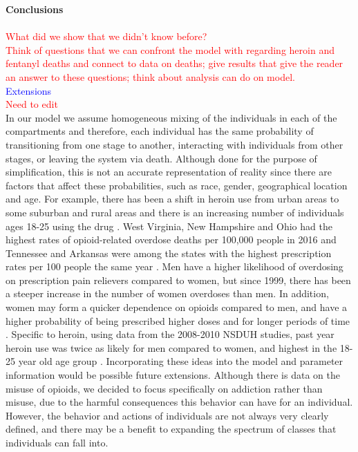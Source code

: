 \documentclass[12pt]{article}
\begin{document}
 
\textbf{Conclusions} \\ \\
 \textcolor{red}{What did we show that we didn't know before?} \\
 \textcolor{red}{Think of questions that we can confront the model with regarding heroin and fentanyl deaths and connect to data on deaths; give results that give the reader an answer to these questions; think about analysis can do on model.} \\
 
 \textcolor{blue}{Extensions}\\
 \textcolor{red}{Need to edit} \\
In our model we assume homogeneous mixing of the individuals in each of the compartments and therefore, each individual has the same probability of transitioning from one stage to another, interacting with individuals from other stages, or leaving the system via death. Although done for the purpose of simplification, this is not an accurate representation of reality since there are factors that affect these probabilities, such as race, gender, geographical location and age. For example, there has been a shift in heroin use from urban areas to some suburban and rural areas and there is an increasing number of individuals ages 18-25 using the drug \cite{NIDA2}. West Virginia, New Hampshire and Ohio had the highest rates of opioid-related overdose deaths per 100,000 people in 2016 and Tennessee and Arkansas were among the states with the highest prescription rates per 100 people the same year \cite{NIH3}. Men have a higher likelihood of overdosing on prescription pain relievers compared to women, but since 1999, there has been a steeper increase in the number of women overdoses than men. In addition, women may form a quicker dependence on opioids compared to men, and have a higher probability of being prescribed higher doses and for longer periods of time \cite{CDC5}. Specific to heroin, using data from the 2008-2010 NSDUH studies, past year heroin use was twice as likely for men compared to women, and highest in the 18-25 year old age group \cite{Jones}. Incorporating these ideas into the model and parameter information would be possible future extensions. Although there is data on the misuse of opioids, we decided to focus specifically on addiction rather than misuse, due to the harmful consequences this behavior can have for an individual. However, the behavior and actions of individuals are not always very clearly defined, and there may be a benefit to expanding the spectrum of classes that individuals can fall into. 
\end{document}
